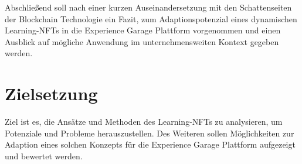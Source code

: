 Abschließend soll nach einer kurzen Auseinandersetzung mit den Schattenseiten der Blockchain Technologie ein Fazit,
zum Adaptionspotenzial eines dynamischen Learning-\ac{NFT}s in die Experience Garage Plattform vorgenommen
und einen Ausblick auf mögliche Anwendung im unternehmensweiten Kontext gegeben werden.

\section{Zielsetzung}

Ziel ist es, die Ansätze und Methoden des Learning-\ac{NFT}s zu analysieren, um Potenziale und Probleme herauszustellen.
Des Weiteren sollen Möglichkeiten zur Adaption eines solchen Konzepts für die Experience Garage Plattform aufgezeigt und bewertet werden.